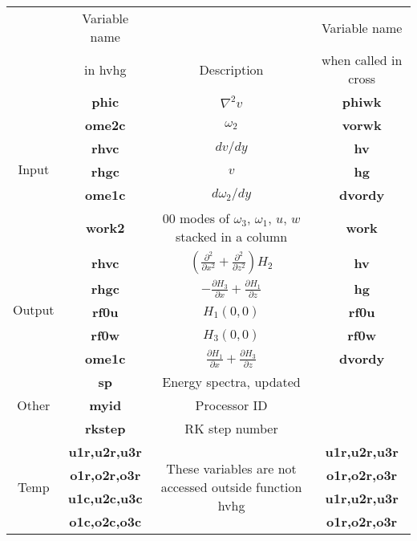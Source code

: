 \documentclass[titlepage,12pt,letter]{article}
\newcommand{\p}{\partial}
\newcommand{\paren}[1]{\left( #1 \right)}
\numberwithin{equation}{section}
\begin{document}
\begin{table}[H]
	\centering 
	\renewcommand{\arraystretch}{1.4} 
	\begin{tabular}{c|c|c|c}
		&Variable name &           &Variable name        \\
		&in hvhg       &Description&when called in cross \\ \hline
		\multirow{6}{*}{Input}&\textbf{phic}&$\nabla^2v$&\textbf{phiwk}\\
		&\textbf{ome2c}&$\omega_2$&\textbf{vorwk}\\
		&\textbf{rhvc}&$dv/dy$&\textbf{hv}\\
		&\textbf{rhgc}&$v$&\textbf{hg}\\
		&\textbf{ome1c}&$d \omega_2/dy$ &\textbf{dvordy}\\ 
		&\textbf{work2}& 00 modes of $\omega_3$, $\omega_1$, $u$, $w$ stacked in a column&\textbf{work}\\
		
		\hline
		
		\multirow{5}{*}{Output}&\textbf{rhvc}& $\paren{\frac{\p^2}{\p x^2}+\frac{\p^2}{\p z^2}} H_2$&\textbf{hv}\\
		&\textbf{rhgc}&$-\frac{\p H_3}{\p x} + \frac{\p H_1}{\p z}$&\textbf{hg}\\
		&\textbf{rf0u}&$H_1(0,0)$&\textbf{rf0u}\\
		&\textbf{rf0w}&$H_3(0,0)$&\textbf{rf0w}\\
		&\textbf{ome1c}&$\frac{\p H_1}{\p x} + \frac{\p H_3}{\p z}$&\textbf{dvordy}\\
		
		\hline
		
		\multirow{3}{*}{Other}&\textbf{sp}&Energy spectra, updated&\\
		&\textbf{myid}&Processor ID&\\
		&\textbf{rkstep}&RK step number&\\
		
		\hline
		
		\multirow{4}{*}{Temp}&\textbf{u1r,u2r,u3r}&\multirow{4}{6cm}{These variables are not accessed outside function hvhg}&\textbf{u1r,u2r,u3r}\\
		&\textbf{o1r,o2r,o3r}&&\textbf{o1r,o2r,o3r}\\
		&\textbf{u1c,u2c,u3c}&&\textbf{u1r,u2r,u3r}\\
		&\textbf{o1c,o2c,o3c}&&\textbf{o1r,o2r,o3r}\\
		
		\hline
		
	\end{tabular} 
\end{table} 
\end{document}
